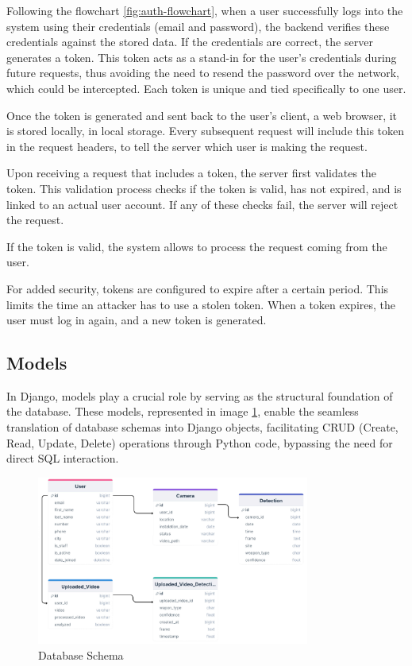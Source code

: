 Following the flowchart \ref{fig:auth-flowchart}, when a user successfully logs into the system using their credentials (email and password), the backend 
verifies these credentials against the stored data. If the credentials are correct, the server generates a token. 
This token acts as a stand-in for the user's credentials during future requests, thus avoiding the need to resend 
the password over the network, which could be intercepted. Each token is unique and tied specifically to one user.

Once the token is generated and sent back to the user's client, a web browser, it is stored locally, in local storage. 
Every subsequent request will include this token in the request headers, to tell the server which user is making 
the request.

Upon receiving a request that includes a token, the server first validates the token. This validation process checks 
if the token is valid, has not expired, and is linked to an actual user account. If any of these checks fail, 
the server will reject the request.

If the token is valid, the system allows to process the request coming from the user.

For added security, tokens are configured to expire after a certain period. This limits the time an attacker has to 
use a stolen token. When a token expires, the user must log in again, and a new token is generated.

\subsection{Models}

In Django, models play a crucial role by serving as the structural foundation of the database. 
These models, represented in image \ref{fig:db-schema}, enable the seamless translation of database schemas into Django objects, facilitating CRUD 
(Create, Read, Update, Delete) operations through Python code, bypassing the need for direct SQL interaction.

\begin{figure}[h]
    \centering 
    \includegraphics[width=0.8\textwidth]{figs/database-schema2.png} 
    \caption{Database Schema}
    \label{fig:db-schema}
\end{figure}

